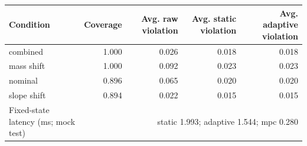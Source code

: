 \begin{tabular}{lrrrr}
\toprule
Condition & Coverage & Avg. raw violation & Avg. static violation & Avg. adaptive violation  \\
\midrule
combined & 1.000 & 0.026 & 0.018 & 0.018  \\
mass shift & 1.000 & 0.092 & 0.023 & 0.023  \\
nominal & 0.896 & 0.065 & 0.020 & 0.020  \\
slope shift & 0.894 & 0.022 & 0.015 & 0.015  \\
\midrule
Fixed-state latency (ms; mock test) & \multicolumn{4}{r}{static 1.993; adaptive 1.544; mpc 0.280}  \\
\bottomrule
\end{tabular}
